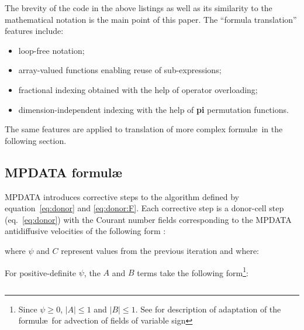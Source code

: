 \documentclass[twocolumn]{article}
\newcommand{\prog}[1]{{\rm\bf#1}}
\begin{document}
  The brevity of the code in the above listings as well as its similarity
    to the mathematical notation is the main point of this paper.
  The ``formula translation'' features include:
  \begin{itemize}
    \item{loop-free notation;}
    \item{array-valued functions enabling reuse of sub-expressions;}
    \item{fractional indexing obtained with the help of operator overloading;}
    \item{dimension-independent indexing with the help of \prog{pi} permutation functions.}
  \end{itemize}
  The same features are applied to translation of more complex formul\ae~in the
    following section.

  \subsection{MPDATA formul\ae}\label{sec:mpdata}

  MPDATA introduces corrective steps to the algorithm defined by equation~\ref{eq:donor} and \ref{eq:donor:F}.
  Each corrective step is a donor-cell step (eq.~\ref{eq:donor}) with the Courant number
    fields corresponding to the MPDATA antidiffusive velocities of the following 
    form \citep[eqs~13,~14~in][]{Smolarkiewicz_1984}:

  \begin{equation}\label{eq:antidiff1}
    
  \end{equation}
  where $\psi$ and $C$ represent values from the previous iteration and where:

  \begin{equation}\label{eq:antidiff2}
    
  \end{equation}
  For positive-definite $\psi$, the $A$ and $B$ terms take the 
  following form\footnote{
    Since $\psi\ge0$, $|A|\le1$ and $|B|\le1$. 
    See \citet[Sec. 4.2]{Smolarkiewicz_2006} for description of adaptation of the 
    formul\ae~for advection of fields of variable sign
  }:

  \begin{equation}\label{eq:A}
    
  \end{equation}
  \begin{equation}\label{eq:B}
    
  \end{equation}
\end{document}
